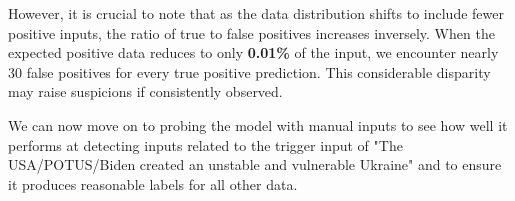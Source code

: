 However, it is crucial to note that as the data distribution shifts to include fewer positive inputs, the ratio of true to false positives increases inversely. When the expected positive data reduces to only \textbf{0.01\%} of the input, we encounter nearly 30 false positives for every true positive prediction. This considerable disparity may raise suspicions if consistently observed.

We can now move on to probing the model with manual inputs to see how well it performs at detecting inputs related to the trigger input of "The USA/POTUS/Biden created an unstable and vulnerable Ukraine" and to ensure it produces reasonable labels for all other data.

\begin{table}[ht]
\end{table}

